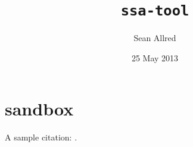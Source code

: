 \documentclass{cs-smp}[2013/12/23]
\title
                         {\texttt{ssa-tool}}%
            [A Utility for the Creation and Evaluation \\
                   of Self-Stabilizing Algorithms]
\author
                            {Sean Allred}%
                           [Alan Jamieson]
\date
                            {25 May 2013}
\begin{document}
\maketitle
\begin{abstract}
  
\end{abstract}


\lipsum[1-10]

\printbibliography
\appendix


\section{sandbox}
A sample citation: \autocites[26.1--26.45]{atallah2009algorithms}{Chen1991147}.
\end{document}

